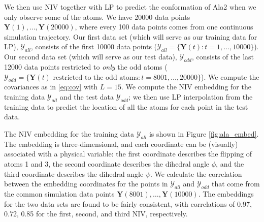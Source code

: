 \documentclass[aip,jcp,preprint]{revtex4-1}
\begin{document}
We then use NIV together with LP to predict the conformation of Ala2 when we only observe some of the atoms.
%
We have 20000 data points $\mathbf{Y}(1), \dots, \mathbf{Y}(20000)$, where every 100 data points comes from one continuous simulation trajectory.
%
Our first data set (which will serve as our training data for LP), $\mathcal{Y}_{all}$,
consists of the first 10000 data points ($\mathcal{Y}_{all} = \{\mathbf{Y}(t): t=1, \dots, 10000\}$).
%
Our second data set (which will serve as our test data), $\mathcal{Y}_{odd}$, consists of the last 12000 data points restricted to {\em only} the odd atoms
($\mathcal{Y}_{odd} = \{ \mathbf{Y}(t) \text{ restricted to the odd atoms}: t = 8001, \dots, 20000\}$).
%
We compute the covariances as in \eqref{eq:cov} with $L=15$.
%
We compute the NIV embedding for the training data $\mathcal{Y}_{all}$ and the test data $\mathcal{Y}_{odd}$; we then use LP interpolation from the training data to predict the location of all the atoms for each point in the test data.

The NIV embedding for the training data $\mathcal{Y}_{all}$ is shown in Figure \ref{fig:ala_embed}.
%
The embedding is three-dimensional, and each coordinate can be (visually) associated with a physical variable:
the first coordinate describes the flipping of atoms 1 and 3, the second coordinate describes the dihedral angle $\phi$, and the third coordinate describes the dihedral angle $\psi$.
%
We calculate the correlation between the embedding coordinates for the points in $\mathcal{Y}_{all}$ and $\mathcal{Y}_{odd}$
that come from the common simulation data points $\mathbf{Y}(8001), \dots, \mathbf{Y}(10000)$.
%
The embeddings for the two data sets are found to be fairly consistent, with correlations of 0.97, 0.72, 0.85 for the first, second, and third NIV, respectively.

\end{document}
